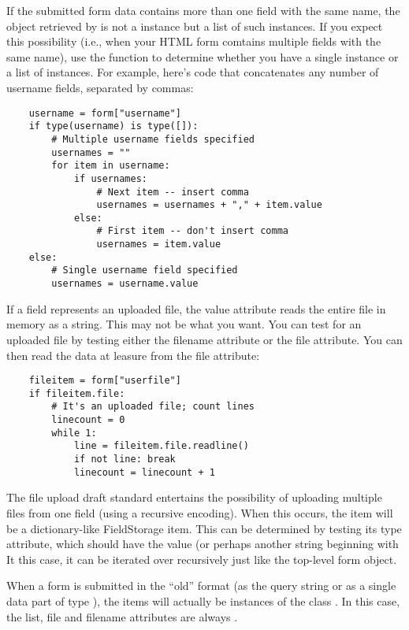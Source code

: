 If the submitted form data contains more than one field with the same
name, the object retrieved by  is not a 
instance but a list of such instances.  If you expect this possibility
(i.e., when your HTML form comtains multiple fields with the same
name), use the  function to determine whether you have a single
instance or a list of instances.  For example, here's code that
concatenates any number of username fields, separated by commas:

\begin{verbatim}
	username = form["username"]
	if type(username) is type([]):
		# Multiple username fields specified
		usernames = ""
		for item in username:
			if usernames:
				# Next item -- insert comma
				usernames = usernames + "," + item.value
			else:
				# First item -- don't insert comma
				usernames = item.value
	else:
		# Single username field specified
		usernames = username.value
\end{verbatim}

If a field represents an uploaded file, the value attribute reads the 
entire file in memory as a string.  This may not be what you want.  You can 
test for an uploaded file by testing either the filename attribute or the 
file attribute.  You can then read the data at leasure from the file 
attribute:

\begin{verbatim}
	fileitem = form["userfile"]
	if fileitem.file:
		# It's an uploaded file; count lines
		linecount = 0
		while 1:
			line = fileitem.file.readline()
			if not line: break
			linecount = linecount + 1
\end{verbatim}

The file upload draft standard entertains the possibility of uploading
multiple files from one field (using a recursive 
encoding).  When this occurs, the item will be a dictionary-like
FieldStorage item.  This can be determined by testing its type
attribute, which should have the value  (or
perhaps another string beginning with   It this case, it
can be iterated over recursively just like the top-level form object.

When a form is submitted in the ``old'' format (as the query string or as a 
single data part of type ), the items 
will actually be instances of the class .  In this case,
the list, file and filename attributes are always .


